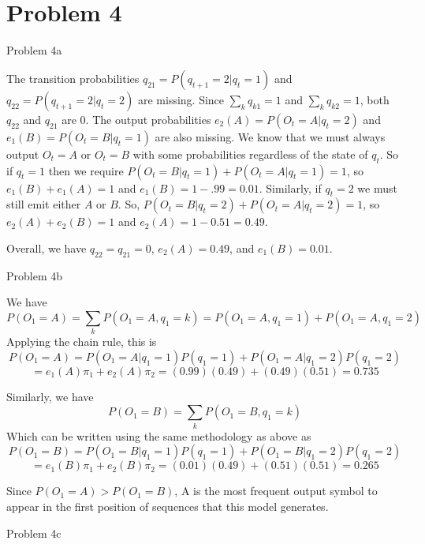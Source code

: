 \documentclass[11pt]{article}
\newcommand{\solution}[1]{{{\color{blue}{\bf Solution:} {#1}}}}
\begin{document}
\newpage

\section{Problem 4}

\item Problem 4a

\solution{
The transition probabilities $q_{21} = P(q_{t+1} = 2 | q_{t} = 1)$ and $q_{22} = P(q_{t+1} = 2 | q_t = 2)$ are missing. Since $\sum_k q_{k1} = 1$ and $\sum_k q_{k2} = 1$, both $q_{22}$ and $q_{21}$ are $0$. \newline{}
The output probabilities $e_2(A) = P(O_t = A | q_t = 2)$ and $e_1(B) = P(O_t = B | q_t = 1)$ are also missing. We know that we must always output $O_t = A$ or $O_t = B$ with some probabilities regardless of the state of $q_t$. So if $q_t = 1$ then we require $P(O_t = B | q_t = 1) + P(O_t = A | q_t = 1) = 1$, so $e_1(B) + e_1(A) = 1$ and $e_1(B) = 1 - .99 = 0.01$. \newline{} Similarly, if $q_t = 2$ we must still emit either $A$ or $B$. So, $P(O_t = B | q_t = 2) + P(O_t = A | q_t = 2) = 1$, so $e_2(A) + e_2(B) = 1$ and $e_2(A) = 1 - 0.51 = 0.49$. \newline{}

Overall, we have $q_{22} = q_{21} = 0$, $e_2(A) = 0.49$, and $e_1(B) = 0.01$. 
}

\item Problem 4b

\solution{
We have \[ P(O_1 = A) = \sum_k P(O_1 = A, q_1 = k) = P(O_1 = A, q_1 = 1) + P(O_1 = A, q_1 = 2) \] Applying the chain rule, this is \[P(O_1 = A) = P(O_1 = A | q_1 = 1) P (q_1 = 1) + P(O_1 = A | q_1 = 2) P(q_1 = 2)\] \[ = e_1(A)\pi_1 + e_2(A)\pi_2 = (0.99)(0.49) + (0.49)(0.51) = 0.735 \]

Similarly, we have \[ P(O_1 = B) = \sum_k P(O_1 = B, q_1 = k) \] Which can be written using the same methodology as above as \[ P(O_1 = B) = P(O_1 = B | q_1 = 1) P(q_1 = 1) + P(O_1 = B | q_1 = 2)P(q_1 = 2) \] \[ = e_1(B)\pi_1 + e_2(B)\pi_2 = (0.01)(0.49) + (0.51)(0.51) = 0.265 \]

Since $P(O_1 = A) > P(O_1 = B)$, A is the most frequent output symbol to appear in the first position of sequences that this model generates. 
}

\item Problem 4c
\end{document}
